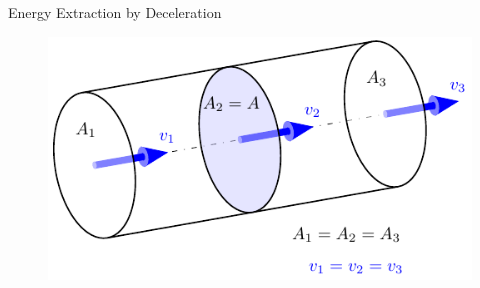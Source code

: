 \begin{frame}{Energy Extraction by Deceleration} 
\begin{figure}[htbp]
	\begin{center}
		\begin{minipage}[c]{0.4\linewidth}
			\includegraphics[width=\linewidth]{WEN/streamtube1.pdf}
		\end{minipage}
		\begin{minipage}[c]{0.15\linewidth}

\end{minipage}
\end{center}
\end{figure}
\end{frame}
